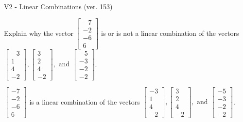 \begin{exercise}
  \begin{exerciseTitle}V2 - Linear Combinations (ver. 153)\end{exerciseTitle}
  \begin{exerciseStatement}
    Explain why the vector \(\left[\begin{array}{c}
-7 \\
-2 \\
-6 \\
6
\end{array}\right]\)  is or is not a linear 
	combination of the vectors \(\left[\begin{array}{c}
-3 \\
1 \\
4 \\
-2
\end{array}\right] , \left[\begin{array}{c}
3 \\
2 \\
4 \\
-2
\end{array}\right] , \text{ and } \left[\begin{array}{c}
-5 \\
-3 \\
-2 \\
-2
\end{array}\right]\).
	


  \end{exerciseStatement}
  \begin{exerciseAnswer}
   \(\left[\begin{array}{c}
-7 \\
-2 \\
-6 \\
6
\end{array}\right]\) 
  	 is  
	a linear combination of the vectors \(\left[\begin{array}{c}
-3 \\
1 \\
4 \\
-2
\end{array}\right] , \left[\begin{array}{c}
3 \\
2 \\
4 \\
-2
\end{array}\right] , \text{ and } \left[\begin{array}{c}
-5 \\
-3 \\
-2 \\
-2
\end{array}\right]\).

	
  


  \end{exerciseAnswer}
\end{exercise}